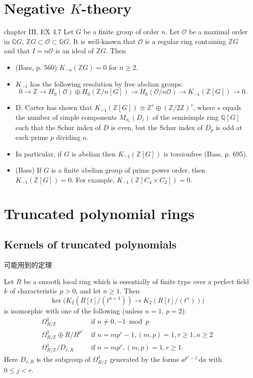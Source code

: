 \section{Negative $K$-theory} %
\label{sec:negativeK}
\cite{weibel2013k} chapter III, EX 4.7
Let $G$ be a finite group of order $n$. Let $\mathcal{O}$ be a maximal order in $\mathbb{Q}G$, $\mathbb{Z}G \subset \mathcal{O} \subset \mathbb{Q}G$. It is well-known that $\mathcal{O}$ is a regular ring containing $\mathbb{Z}G$ and that $I=n\mathcal{O}$ is an ideal of $\mathbb{Z}G$. Then 
\begin{itemize}
	\item (Bass, \cite{MR40:2736} p. 560) $K_{-n}(\mathbb{Z}G)=0$ for $n\geq 2$. 
	\item $K_{-1}$ has the following resolution by free abelian groups: 
	\[0 \longrightarrow \mathbb{Z} \longrightarrow H_0(\mathcal{O}) \oplus H_0(\mathbb{Z}/n[G]) \longrightarrow H_0( \mathcal{O}/n \mathcal{O}) \longrightarrow K_{-1}(\mathbb{Z}[G]) \longrightarrow 0.\]
	
	\item D. Carter has shown  that $K_{-1}(\mathbb{Z}[G]) \cong \mathbb{Z}^r \oplus(\mathbb{Z}/2\mathbb{Z})^s$, where $s$ equals the number of simple components $M_{n_i}(D_i)$ of the semisimple ring $\mathbb{Q}[G]$ such that the Schur index of $D$ is even, but the Schur index of $D_p$ is odd at each prime $p$ dividing $n$.
	\item  In particular, if $G$ is abelian then $K_{-1}(\mathbb{Z}[G])$ is torsionfree (Bass, \cite{MR40:2736} p. 695).
	\item (Bass) If $G$ is a finite abelian group of prime power order, then $K_{-1}(\mathbb{Z}[G])=0$. For example, $K_{-1}(\mathbb{Z}[C_4\times C_2])=0$.
\end{itemize}



\section{Truncated polynomial rings}
\subsection{Kernels of truncated polynomials}
可能用到的定理
\begin{theorem}
	Let $R$ be a smooth local ring which is essentially of finite
	type over a perfect field $k$ of characteristic $p > 0$, and let $n \geq 1$. Then
	\[\ker \big( K_2 (R[t]/(t^{n+1} )) \longrightarrow K_2 (R[t]/(t^n)) \big)\]
	is isomorphic with one of the following (unless $ n = 1$, $p = 2$):
	\begin{align*}
	\Omega^1_{R/\mathbb{Z}} & \text{ if }n \neq 0, -1 \bmod p \\
	\Omega^1_{R/\mathbb{Z}} \oplus R/R^{p^r} &\text{ if } n = mp^r - 1, (m,p) = 1, r \geq 1, n \geq 2\\
	\Omega^1_{R/\mathbb{Z}} /D_{r,R} &\text{ if } n = mp^r , (m,p) = 1, r \geq 1.
	\end{align*}
	Here $D_{r,R}$ is the subgroup of $\Omega^1_{R/\mathbb{Z}}$ generated by the forms $a^{p^j-1}\, \mathrm{d} a$ with $0 \leq j < r$.
\end{theorem}

